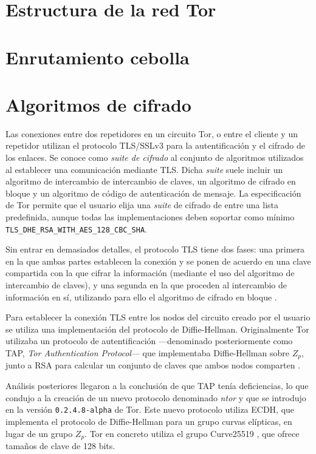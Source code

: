 \documentclass[
  a4paper,
  12pt,
  spanish,
]{scrartcl}
\begin{document}
\section{Estructura de la red Tor}

\section{Enrutamiento cebolla}

\section{Algoritmos de cifrado}

Las conexiones entre dos repetidores en un circuito Tor, o entre el cliente y un repetidor utilizan el protocolo TLS/SSLv3 para la autentificación y el cifrado de los enlaces. 
Se conoce como \textit{suite de cifrado} al conjunto de algoritmos utilizados al establecer una comunicación mediante TLS. 
Dicha \textit{suite} suele incluir un algoritmo de intercambio de intercambio de claves, un algoritmo de cifrado en bloque y un algoritmo de código de autenticación de mensaje. 
La especificación de Tor \parencite{dingledine_tor_2019} permite que el usuario elija una \textit{suite} de cifrado de entre una lista predefinida, aunque todas las implementaciones deben soportar como mínimo \texttt{TLS\_DHE\_RSA\_WITH\_AES\_128\_CBC\_SHA}.

Sin entrar en demasiados detalles, el protocolo TLS tiene dos fases: una primera en la que ambas partes establecen la conexión y se ponen de acuerdo en una clave compartida con la que cifrar la información (mediante el uso del algoritmo de intercambio de claves), y una segunda en la que proceden al intercambio de información en sí, utilizando para ello el algoritmo de cifrado en bloque \parencite{ibm_overview_2019}.

Para establecer la conexión TLS entre los nodos del circuito creado por el usuario se utiliza una implementación del protocolo de Diffie-Hellman. 
Originalmente Tor utilizaba un protocolo de autentificación ---denominado posteriormente como TAP, \textit{Tor Authentication Protocol}--- que implementaba Diffie-Hellman sobre \(Z_p\), junto a RSA para calcular un conjunto de claves que ambos nodos comparten \parencite{dingledine_tor:_2004}. 

Análisis posteriores \parencite{hutchison_security_2006} llegaron a la conclusión de que TAP tenía deficiencias, lo que condujo a la creación de un nuevo protocolo denominado \textit{ntor} y que se introdujo en la versión \texttt{0.2.4.8-alpha} de Tor. 
Este nuevo protocolo utiliza ECDH, que implementa el protocolo  de Diffie-Hellman para un grupo curvas elípticas, en lugar de un grupo \(Z_p\). Tor en concreto utiliza el grupo Curve25519 \parencite{yung_curve25519:_2006}, que ofrece tamaños de clave de 128 bits.
\end{document}
